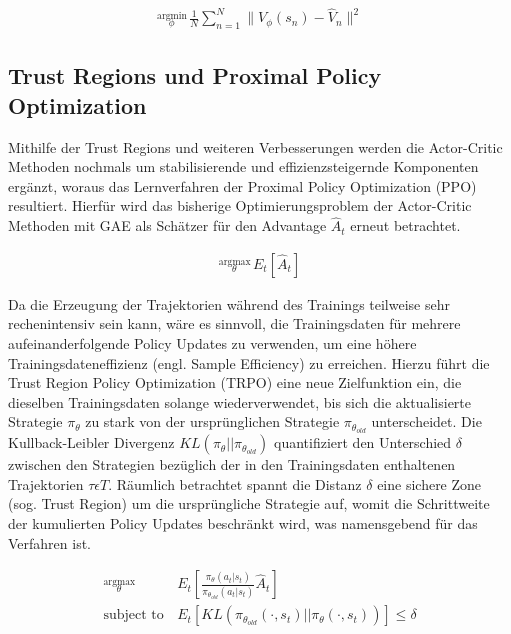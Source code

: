 \begin{equation}
\begin{aligned}
\stackrel{\text{argmin}}{{}_\phi} \, \frac{1}{N} \sum_{n=1}^N \lVert V_\phi(s_n) - \hat{V}_n \rVert^2
\end{aligned}
\end{equation}

\subsection{Trust Regions und Proximal Policy Optimization} \label{sec:ppo}
Mithilfe der Trust Regions \cite{schulman2017trust} und weiteren Verbesserungen
werden die Actor-Critic Methoden nochmals um stabilisierende und effizienzsteigernde
Komponenten ergänzt, woraus das Lernverfahren der Proximal Policy Optimization (PPO)
\cite{schulman2018ppo} resultiert. Hierfür wird das bisherige Optimierungsproblem
der Actor-Critic Methoden mit GAE als Schätzer für den Advantage $\hat{A}_t$
erneut betrachtet.

\begin{equation}
\begin{aligned}
\stackrel{\text{argmax}}{{}_\theta} \, E_t[\hat{A}_t]
\end{aligned}
\end{equation}

Da die Erzeugung der Trajektorien während des Trainings teilweise sehr rechenintensiv
sein kann, wäre es sinnvoll, die Trainingsdaten für mehrere aufeinanderfolgende
Policy Updates zu verwenden, um eine höhere Trainingsdateneffizienz (engl. Sample
Efficiency) zu erreichen. Hierzu führt die Trust Region Policy Optimization (TRPO)
\cite{schulman2017trust} eine neue Zielfunktion ein, die dieselben Trainingsdaten
solange wiederverwendet, bis sich die aktualisierte Strategie $\pi_\theta$ zu stark
von der ursprünglichen Strategie $\pi_{\theta_{old}}$ unterscheidet.
Die Kullback-Leibler Divergenz $KL(\pi_\theta || \pi_{\theta_{old}})$ quantifiziert
den Unterschied $\delta$ zwischen den Strategien bezüglich der in den Trainingsdaten
enthaltenen Trajektorien $\tau \epsilon T$. Räumlich betrachtet spannt die Distanz
$\delta$ eine sichere Zone (sog. Trust Region) um die ursprüngliche Strategie auf,
womit die Schrittweite der kumulierten Policy Updates beschränkt wird, was namensgebend
für das Verfahren ist.

\begin{equation}
\begin{aligned}
\stackrel{\text{argmax}}{{}_\theta} \, &E_t\left[ \frac{\pi_\theta(a_t | s_t)}{\pi_{\theta_{old}}(a_t | s_t)}
    \hat{A}_t \right]\\
\text{subject to} \, &E_t[KL(\pi_{\theta_{old}}(\cdot, s_t) || \pi_\theta(\cdot, s_t))] \le \delta
\label{eq:trpo1}
\end{aligned}
\end{equation}

